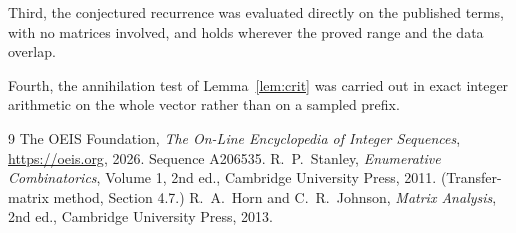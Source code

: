 \documentclass[11pt,a4paper]{article}
\theoremstyle{plain}
\theoremstyle{definition}
\begin{document}
Third, the conjectured recurrence was evaluated directly on the published terms, with no
matrices involved, and holds wherever the proved range and the data overlap.

Fourth, the annihilation test of Lemma~\ref{lem:crit} was carried out in exact integer
arithmetic on the whole vector rather than on a sampled prefix.

\begin{thebibliography}{9}
 The OEIS Foundation, \emph{The On-Line Encyclopedia of Integer
Sequences}, \url{https://oeis.org}, 2026. Sequence A206535.
 R.~P.~Stanley, \emph{Enumerative Combinatorics}, Volume 1, 2nd ed.,
Cambridge University Press, 2011. (Transfer-matrix method, Section 4.7.)
 R.~A.~Horn and C.~R.~Johnson, \emph{Matrix Analysis}, 2nd ed., Cambridge
University Press, 2013.
\end{thebibliography}
\end{document}
